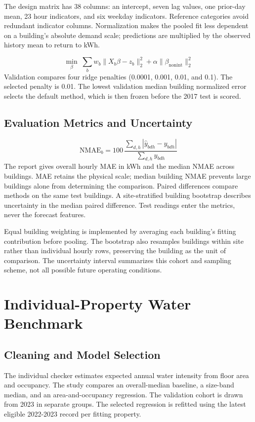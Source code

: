 \documentclass[12pt,a4paper]{article}
\begin{document}
The design matrix has 38 columns: an intercept, seven lag values, one prior-day mean, 23 hour indicators, and six weekday indicators. Reference categories avoid redundant indicator columns. Normalization makes the pooled fit less dependent on a building's absolute demand scale; predictions are multiplied by the observed history mean to return to kWh.

\[\min_{\beta}\;\sum_{b} w_b\lVert X_b\beta-z_b\rVert_2^2+\alpha\lVert\beta_{\mathrm{nonint}}\rVert_2^2\]
Validation compares four ridge penalties (0.0001, 0.001, 0.01, and 0.1). The selected penalty is 0.01. The lowest validation median building normalized error selects the default method, which is then frozen before the 2017 test is scored.

\subsection{Evaluation Metrics and Uncertainty}
\[\mathrm{NMAE}_b=100\,\frac{\sum_{d,h}|\hat y_{bdh}-y_{bdh}|}{\sum_{d,h}y_{bdh}}\]
The report gives overall hourly MAE in kWh and the median NMAE across buildings. MAE retains the physical scale; median building NMAE prevents large buildings alone from determining the comparison. Paired differences compare methods on the same test buildings. A site-stratified building bootstrap describes uncertainty in the median paired difference. Test readings enter the metrics, never the forecast features.

Equal building weighting is implemented by averaging each building's fitting contribution before pooling. The bootstrap also resamples buildings within site rather than individual hourly rows, preserving the building as the unit of comparison. The uncertainty interval summarizes this cohort and sampling scheme, not all possible future operating conditions.

\newpage
\section{Individual-Property Water Benchmark}
\subsection{Cleaning and Model Selection}
The individual checker estimates expected annual water intensity from floor area and occupancy. The study compares an overall-median baseline, a size-band median, and an area-and-occupancy regression. The validation cohort is drawn from 2023 in separate groups. The selected regression is refitted using the latest eligible 2022-2023 record per fitting property.
\end{document}
